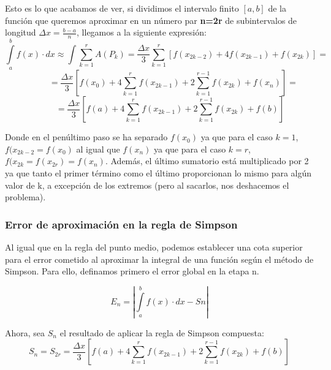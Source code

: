 \documentclass{article}
\begin{document}
			Esto es lo que acabamos de ver, si dividimos el intervalo finito $[a,b]$ de la función que queremos aproximar en un número par \textbf{n=2r} de subintervalos de longitud $\Delta x=\frac{b-a}{n}$, llegamos a la siguiente expresión:
			\begin{equation*}
				\int \limits_{a}^{b} f(x) \cdot dx \approx 
				\int \sum_{k=1}^{r}A(P_k) =
				\frac{\Delta x}{3}\sum_{k=1}^{r}[f(x_{2k-2})+4f(x_{2k-1})+f(x_{2k})] =
			\end{equation*}
			\begin{equation*}
				\;\;\;\;\;\;\;\;\;\;\;\;
				=\frac{\Delta x}{3}[f(x_0)+4\sum_{k=1}^{r}f(x_{2k-1})+2\sum_{k=1}^{r-1}f(x_{2k})+f(x_n)] =
			\end{equation*}
			\begin{equation}
				\;\;\;\;\;\;\;\;\;
				=\frac{\Delta x}{3}[f(a)+4\sum_{k=1}^{r}f(x_{2k-1})+2\sum_{k=1}^{r-1}f(x_{2k})+f(b)]
			\end{equation}
			
			Donde en el penúltimo paso se ha separado $f(x_0)$ ya que para el caso $k=1$, $f(x_{2k-2}=f(x_0)$ al igual que $f(x_n)$ ya que para el caso $k=r$, $f(x_{2k}=f(x_{2r})=f(x_n)$. Además, el último sumatorio está multiplicado por 2 ya que tanto el primer término como el último proporcionan lo mismo para algún valor de k, a excepción de los extremos (pero al sacarlos, nos deshacemos el problema).
			
			\subsubsection{Error de aproximación en la regla de Simpson}
			
			Al igual que en la regla del punto medio, podemos establecer una cota superior para el error cometido al aproximar la integral de una función según el método de Simpson. Para ello, definamos primero el error global en la etapa n.
			
			
			\begin{equation}
				E_n=\left |\displaystyle \int \limits_{a}^{b} f(x) \cdot dx - Sn\right |
			\end{equation}
			
			Ahora, sea $S_n$ el resultado de aplicar la regla de Simpson compuesta:
			\begin{equation}
				S_n = S_{2r} = \frac{\Delta x}{3}
				[f(a)+4\sum_{k=1}^{r}f(x_{2k-1})+2\sum_{k=1}^{r-1}f(x_{2k})+f(b)]
			\end{equation}
			
\end{document}
